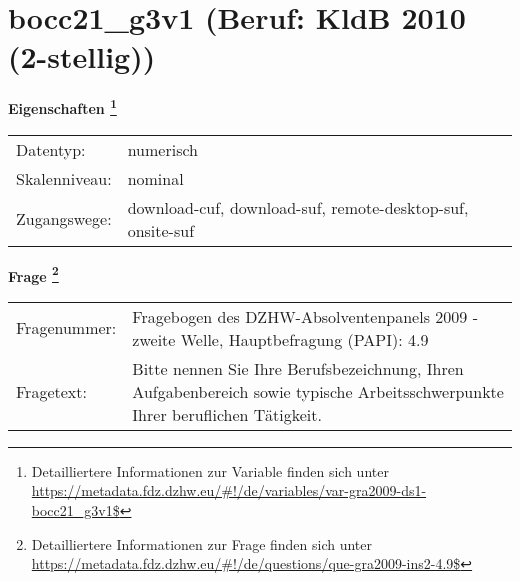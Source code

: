
    \setcounter{footnote}{0}

    \vspace*{-1.8cm}
	\section{bocc21\_g3v1 (Beruf: KldB 2010 (2-stellig))}
	\label{section:bocc21_g3v1}



    \vspace*{0.5cm}
    \noindent\textbf{Eigenschaften
	\footnote{Detailliertere Informationen zur Variable finden sich unter
		\url{https://metadata.fdz.dzhw.eu/\#!/de/variables/var-gra2009-ds1-bocc21_g3v1$}}}\\
	\begin{tabularx}{\hsize}{@{}lX}
	Datentyp: & numerisch \\
	Skalenniveau: & nominal \\
	Zugangswege: &
	  download-cuf, 
	  download-suf, 
	  remote-desktop-suf, 
	  onsite-suf
 \\
    \end{tabularx}



				\vspace*{0.5cm}
                \noindent\textbf{Frage
	                \footnote{Detailliertere Informationen zur Frage finden sich unter
		              \url{https://metadata.fdz.dzhw.eu/\#!/de/questions/que-gra2009-ins2-4.9$}}}\\
				\begin{tabularx}{\hsize}{@{}lX}
					Fragenummer: &
					  Fragebogen des DZHW-Absolventenpanels 2009 - zweite Welle, Hauptbefragung (PAPI):
					  4.9
 \\
					Fragetext: & Bitte nennen Sie Ihre Berufsbezeichnung, Ihren Aufgabenbereich sowie typische Arbeitsschwerpunkte Ihrer beruflichen Tätigkeit. \\
				\end{tabularx}





